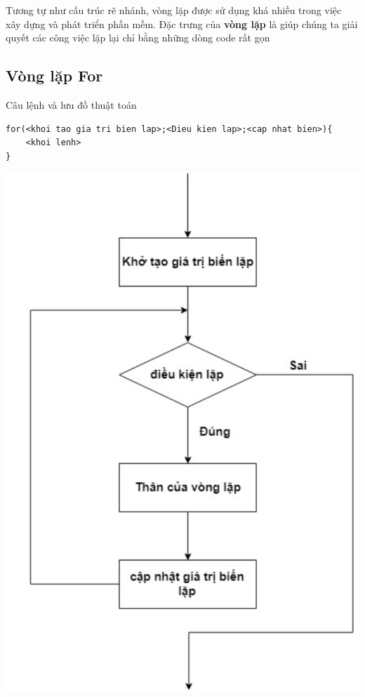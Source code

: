 \documentclass[12pt,a4paper]{article}
\begin{document}
Tương tự như cấu trúc rẽ nhánh, vòng lặp được sử dụng khá nhiều trong việc xây dựng và phát triển phần mềm. Đặc trưng của \textbf{vòng lặp } là giúp chúng ta giải quyết các công việc lặp lại chỉ bằng những dòng code rất gọn
\subsection{Vòng lặp For}
Câu lệnh và lưu đồ thuật toán 
\begin{lstlisting}
for(<khoi tao gia tri bien lap>;<Dieu kien lap>;<cap nhat bien>){
	<khoi lenh>
}
\end{lstlisting}
\begin{center}
	\includegraphics[scale = 0.7]{forflowchart}
\end{center}
\end{document}
